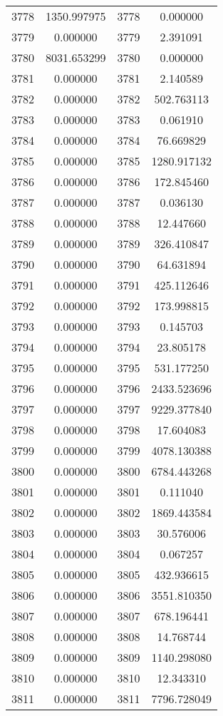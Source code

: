 \documentclass[12pt]{article}
\begin{document}
\begin{longtable}{@{}cccc@{}}
3778 & 1350.997975 & 3778 & 0.000000 \\
3779 & 0.000000 & 3779 & 2.391091 \\
3780 & 8031.653299 & 3780 & 0.000000 \\
3781 & 0.000000 & 3781 & 2.140589 \\
3782 & 0.000000 & 3782 & 502.763113 \\
3783 & 0.000000 & 3783 & 0.061910 \\
3784 & 0.000000 & 3784 & 76.669829 \\
3785 & 0.000000 & 3785 & 1280.917132 \\
3786 & 0.000000 & 3786 & 172.845460 \\
3787 & 0.000000 & 3787 & 0.036130 \\
3788 & 0.000000 & 3788 & 12.447660 \\
3789 & 0.000000 & 3789 & 326.410847 \\
3790 & 0.000000 & 3790 & 64.631894 \\
3791 & 0.000000 & 3791 & 425.112646 \\
3792 & 0.000000 & 3792 & 173.998815 \\
3793 & 0.000000 & 3793 & 0.145703 \\
3794 & 0.000000 & 3794 & 23.805178 \\
3795 & 0.000000 & 3795 & 531.177250 \\
3796 & 0.000000 & 3796 & 2433.523696 \\
3797 & 0.000000 & 3797 & 9229.377840 \\
3798 & 0.000000 & 3798 & 17.604083 \\
3799 & 0.000000 & 3799 & 4078.130388 \\
3800 & 0.000000 & 3800 & 6784.443268 \\
3801 & 0.000000 & 3801 & 0.111040 \\
3802 & 0.000000 & 3802 & 1869.443584 \\
3803 & 0.000000 & 3803 & 30.576006 \\
3804 & 0.000000 & 3804 & 0.067257 \\
3805 & 0.000000 & 3805 & 432.936615 \\
3806 & 0.000000 & 3806 & 3551.810350 \\
3807 & 0.000000 & 3807 & 678.196441 \\
3808 & 0.000000 & 3808 & 14.768744 \\
3809 & 0.000000 & 3809 & 1140.298080 \\
3810 & 0.000000 & 3810 & 12.343310 \\
3811 & 0.000000 & 3811 & 7796.728049 \\

\end{longtable}
\end{document}
